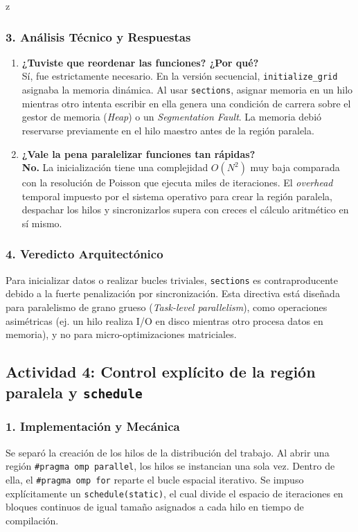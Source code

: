 z\documentclass[11pt,a4paper]{article}
\begin{document}
\subsubsection*{3. Análisis Técnico y Respuestas}

\begin{enumerate}
    \item \textbf{¿Tuviste que reordenar las funciones? ¿Por qué?} \\
    Sí, fue estrictamente necesario. En la versión secuencial, \texttt{initialize\_grid} asignaba la memoria dinámica. Al usar \texttt{sections}, asignar memoria en un hilo mientras otro intenta escribir en ella genera una condición de carrera sobre el gestor de memoria (\textit{Heap}) o un \textit{Segmentation Fault}. La memoria debió reservarse previamente en el hilo maestro antes de la región paralela.

    \item \textbf{¿Vale la pena paralelizar funciones tan rápidas?} \\
    \textbf{No.} La inicialización tiene una complejidad $O(N^2)$ muy baja comparada con la resolución de Poisson que ejecuta miles de iteraciones. El \textit{overhead} temporal impuesto por el sistema operativo para crear la región paralela, despachar los hilos y sincronizarlos supera con creces el cálculo aritmético en sí mismo.
\end{enumerate}

\subsubsection*{4. Veredicto Arquitectónico}
Para inicializar datos o realizar bucles triviales, \texttt{sections} es contraproducente debido a la fuerte penalización por sincronización. Esta directiva está diseñada para paralelismo de grano grueso (\textit{Task-level parallelism}), como operaciones asimétricas (ej. un hilo realiza I/O en disco mientras otro procesa datos en memoria), y no para micro-optimizaciones matriciales.
\subsection*{Actividad 4: Control explícito de la región paralela y \texttt{schedule}}

\subsubsection*{1. Implementación y Mecánica}
Se separó la creación de los hilos de la distribución del trabajo. Al abrir una región \texttt{\#pragma omp parallel}, los hilos se instancian una sola vez. Dentro de ella, el \texttt{\#pragma omp for} reparte el bucle espacial iterativo. Se impuso explícitamente un \texttt{schedule(static)}, el cual divide el espacio de iteraciones en bloques continuos de igual tamaño asignados a cada hilo en tiempo de compilación.
\end{document}

